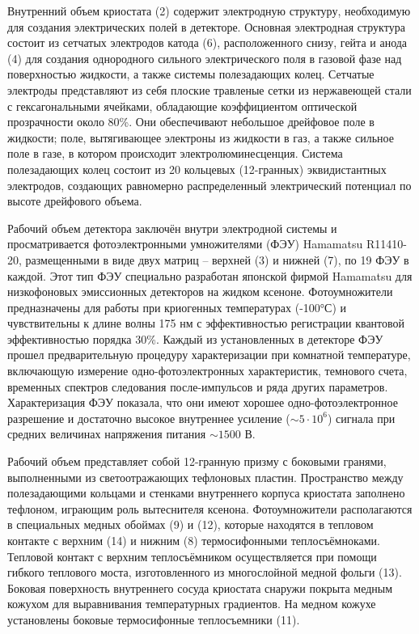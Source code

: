 \par Внутренний объем криостата (2) содержит электродную структуру, необходимую для создания электрических полей в детекторе. Основная электродная структура состоит из сетчатых электродов катода (6), расположенного снизу, гейта и анода (4) для создания однородного сильного электрического поля в газовой фазе над поверхностью жидкости, а также системы полезадающих колец. Сетчатые электроды представляют из себя плоские травленые сетки из нержавеющей стали с гексагональными ячейками, обладающие коэффициентом оптической прозрачности около 80\%. Они обеспечивают небольшое дрейфовое поле в жидкости; поле, вытягивающее электроны из жидкости в газ, а также сильное поле в газе, в котором происходит электролюминесценция. Система полезадающих колец состоит из 20 кольцевых (12-гранных) эквидистантных электродов, создающих равномерно распределенный электрический потенциал по высоте дрейфового объема. 
\par Рабочий объем детектора заключён внутри электродной системы и просматривается фотоэлектронными умножителями (ФЭУ) Hamamatsu R11410-20, размещенными в виде двух матриц – верхней (3) и нижней (7), по 19 ФЭУ в каждой. Этот тип ФЭУ специально разработан японской фирмой Hamamatsu для низкофоновых эмиссионных детекторов на жидком ксеноне. Фотоумножители предназначены для работы при криогенных температурах (-100°С) и чувствительны к длине волны 175 нм с эффективностью регистрации квантовой эффективностью порядка 30\%. Каждый из установленных в детекторе ФЭУ прошел предварительную процедуру характеризации при комнатной температуре, включающую измерение одно-фотоэлектронных характеристик, темнового счета, временных спектров следования после-импульсов и ряда других параметров\cite{Akimov2017}. Характеризация ФЭУ показала, что они имеют хорошее одно-фотоэлектронное разрешение и достаточно высокое внутреннее усиление ($\sim 5\cdot10^6$) сигнала при средних величинах напряжения питания $\sim 1500$ В. 
\par Рабочий объем представляет собой 12-гранную призму с боковыми гранями, выполненными из светоотражающих тефлоновых пластин. Пространство между полезадающими кольцами и стенками внутреннего корпуса криостата заполнено тефлоном, играющим роль вытеснителя ксенона. Фотоумножители располагаются в специальных медных обоймах (9) и (12), которые находятся в тепловом контакте с верхним (14) и нижним (8) термосифонными теплосъёмноками. Тепловой контакт с верхним теплосъёмником осуществляется при помощи гибкого теплового моста, изготовленного из многослойной медной фольги (13). Боковая поверхность внутреннего сосуда криостата снаружи покрыта медным кожухом для выравнивания температурных градиентов. На медном кожухе установлены боковые термосифонные теплосъемники (11).

